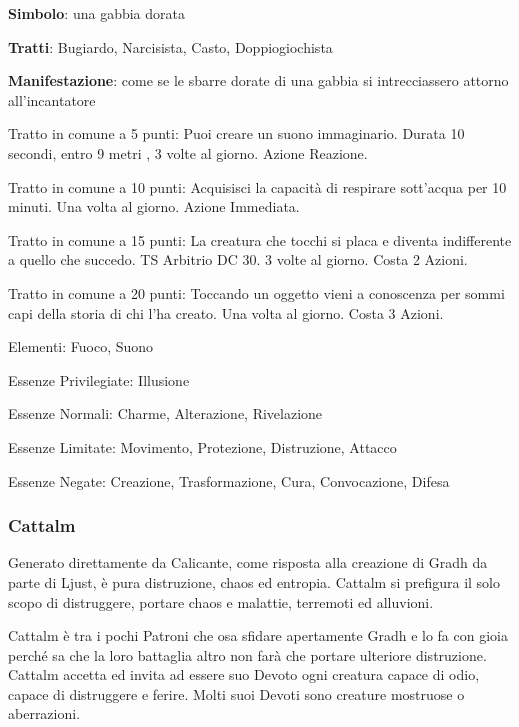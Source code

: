 \documentclass[a4paper,11pt,twoside,openany]{book}
\begin{document}
\textbf{Simbolo}: una gabbia dorata

\textbf{Tratti}: Bugiardo, Narcisista, Casto, Doppiogiochista

\textbf{Manifestazione}: come se le sbarre dorate di una gabbia si intrecciassero attorno all'incantatore

\bigskip

Tratto in comune a 5 punti: Puoi creare un suono immaginario. Durata 10 secondi, entro 9 metri , 3 volte al giorno. Azione Reazione.

Tratto in comune a 10 punti: Acquisisci la capacità di respirare sott'acqua per 10 minuti. Una volta al giorno. Azione Immediata.

Tratto in comune a 15 punti: La creatura che tocchi si placa e diventa indifferente a quello che succedo. TS Arbitrio DC 30. 3 volte al giorno. Costa 2 Azioni.

Tratto in comune a 20 punti: Toccando un oggetto vieni a conoscenza per sommi capi della storia di chi l'ha creato. Una volta al giorno. Costa 3 Azioni.

\bigskip

Elementi: Fuoco, Suono

\bigskip

Essenze Privilegiate: Illusione

Essenze Normali: Charme, Alterazione, Rivelazione

Essenze Limitate: Movimento, Protezione, Distruzione, Attacco

Essenze Negate: Creazione, Trasformazione, Cura, Convocazione, Difesa

\subsubsection{Cattalm}

\label{cattalm}

Generato direttamente da Calicante, come risposta alla creazione di Gradh da parte di Ljust, è pura distruzione, chaos ed entropia. Cattalm si prefigura il solo scopo di distruggere, portare chaos e malattie, terremoti ed alluvioni.

Cattalm è tra i pochi Patroni che osa sfidare apertamente Gradh e lo fa con gioia perché sa che la loro battaglia altro non farà che portare ulteriore distruzione. Cattalm accetta ed invita ad essere suo Devoto ogni creatura capace di odio, capace di distruggere e ferire. Molti suoi Devoti sono creature mostruose o aberrazioni.
\end{document}
